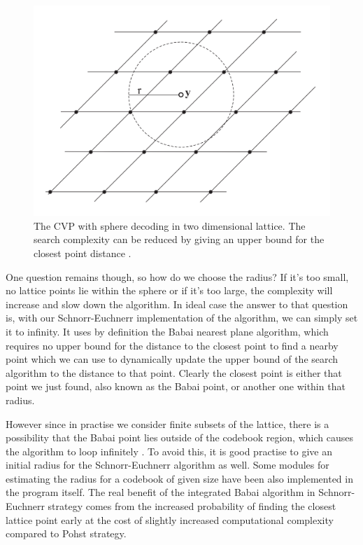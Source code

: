 \documentclass[english,12pt,a4paper,pdftex,sci,utf8]{aaltothesis}
\begin{document}
\begin{figure}[ht]
  \centering
  \includegraphics[width=0.8\linewidth]{sphere_decoder}
  \caption{The CVP with sphere decoding in two dimensional lattice. The search complexity can be reduced by giving an upper bound for the closest point distance \cite{mia}.}
  \label{fig:sphdec}
\end{figure}

\par One question remains though, so how do we choose the radius? If it's too small, no lattice points lie within the sphere or if it's too large, the complexity will increase and slow down the algorithm. In ideal case the answer to that question is, with our Schnorr-Euchnerr implementation of the algorithm, we can simply set it to infinity. It uses by definition the Babai nearest plane algorithm, which requires no upper bound for the distance to the closest point to find a nearby point which we can use to dynamically update the upper bound of the search algorithm to the distance to that point.  Clearly the closest point is either that point we just found, also known as the Babai point, or another one within that radius. 
\par However since in practise we consider finite subsets of the lattice, there is a possibility that the Babai point lies outside of the codebook region, which causes the algorithm to loop infinitely \cite{agrell}. To avoid this, it is good practise to give an initial radius for the Schnorr-Euchnerr algorithm as well. Some modules for estimating the radius for a codebook of given size have been also implemented in the program itself. The real benefit of the integrated Babai algorithm in Schnorr-Euchnerr strategy comes from the increased probability of finding the closest lattice point early at the cost of slightly increased computational complexity compared to Pohst strategy.
\end{document}
